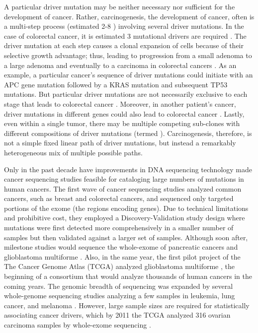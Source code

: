 A particular driver mutation may be neither necessary nor sufficient for the development of cancer. Rather, carcinogenesis, the development of cancer, often is a multi-step process (estimated 2-8 \cite{RN25}) involving several driver mutations. In the case of colorectal cancer, it is estimated 3 mutational drivers are required \cite{RN27}. The driver mutation at each step causes a clonal expansion of cells because of their selective growth advantage; thus, leading to progression from a small adenoma to a large adenoma and eventually to a carcinoma in colorectal cancers \cite{RN26}. As an example, a particular cancer's sequence of driver mutations could initiate with an APC gene mutation followed by a KRAS mutation and subsequent TP53 mutations. But particular driver mutations are not necessarily exclusive to each stage that leads to colorectal cancer \cite{RN26}. Moreover, in another patient's cancer, driver mutations in different genes could also lead to colorectal cancer \cite{RN48}. Lastly, even within a single tumor, there may be multiple competing sub-clones with different compositions of driver mutations (termed ).  Carcinogenesis, therefore, is not a simple fixed linear path of driver mutations, but instead a remarkably heterogeneous mix of multiple possible paths. 

Only in the past decade have improvements in DNA sequencing technology made cancer sequencing studies feasible for cataloging large numbers of mutations in human cancers. The first wave of cancer sequencing studies \cite{RN2, RN4, RN3} analyzed common cancers, such as breast and colorectal cancers, and sequenced only targeted portions of the exome (the regions encoding genes). Due to technical limitations and prohibitive cost, they employed a Discovery-Validation study design where mutations were first detected more comprehensively in a smaller number of samples but then validated against a larger set of samples. Although soon after, milestone studies would sequence the whole-exome of pancreatic cancers \cite{RN5} and glioblastoma multiforme \cite{RN6}.  Also, in the same year, the first pilot project of the The Cancer Genome Atlas (TCGA) analyzed glioblastoma multiforme \cite{RN7}, the beginning of a consortium that would analyze thousands of human cancers in the coming years. The genomic breadth of sequencing was expanded by several whole-genome sequencing studies analyzing a few samples in leukemia, lung cancer, and melanoma \cite{RN8, RN9, RN10}. However, large sample sizes are required for statistically associating cancer drivers, which by 2011 the TCGA analyzed 316 ovarian carcinoma samples by whole-exome sequencing \cite{RN11}.

